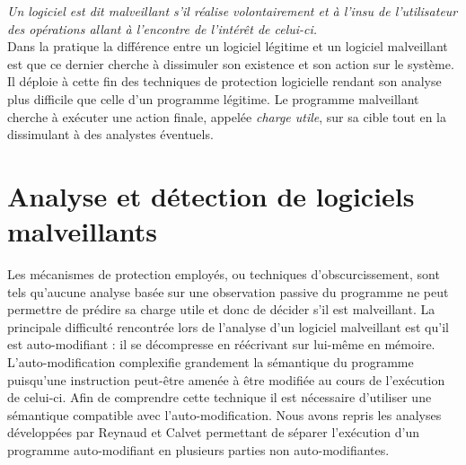 \textit{Un logiciel est dit malveillant s'il réalise volontairement et à l'insu de l'utilisateur des opérations allant à l'encontre de l'intérêt de celui-ci.}
\\ 



Dans la pratique la différence entre un logiciel légitime et un logiciel malveillant est que ce dernier cherche à dissimuler son existence et son action sur le système.
Il déploie à cette fin des techniques de protection logicielle rendant son analyse plus difficile que celle d'un programme légitime.
Le programme malveillant cherche à exécuter une action finale, appelée \emph{charge utile}, sur sa cible tout en la dissimulant à des analystes éventuels.

\section*{Analyse et détection de logiciels malveillants}

Les mécanismes de protection employés, ou techniques d'obscurcissement, sont tels qu'aucune analyse basée sur une observation passive du programme ne peut permettre de prédire sa charge utile et donc de décider s'il est malveillant.
La principale difficulté rencontrée lors de l'analyse d'un logiciel malveillant est qu'il est auto-modifiant : il se décompresse en réécrivant sur lui-même en mémoire. L'auto-modification complexifie grandement la sémantique du programme puisqu'une instruction peut-être amenée à être modifiée au cours de l'exécution de celui-ci.
Afin de comprendre cette technique il est nécessaire d'utiliser une sémantique compatible avec l'auto-modification.
Nous avons repris les analyses développées par Reynaud \cite{Reynaud2010} et Calvet \cite{Calvet2013} permettant de séparer l'exécution d'un programme auto-modifiant en plusieurs parties non auto-modifiantes. 

